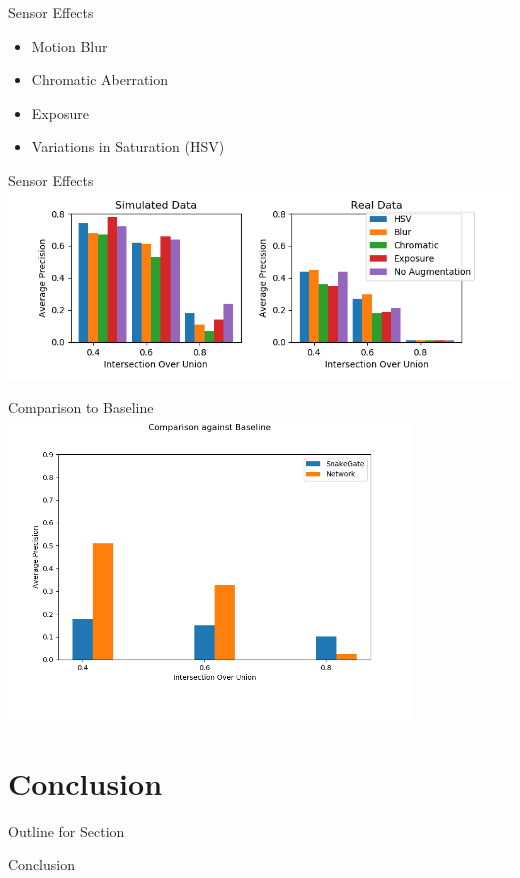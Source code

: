 \documentclass{beamer}
\begin{document}
\begin{darkframes}
    \begin{frame}{Sensor Effects}
\begin{itemize}
	\item Motion Blur 
	\item Chromatic Aberration
	\item Exposure
	\item Variations in Saturation (HSV)
\end{itemize}
\end{frame}
    \begin{frame}{Sensor Effects}
    \includegraphics[width=\textwidth]{../../thesis/fig/pp_bar}
	\end{frame}


      \begin{frame}{Comparison to Baseline}
      \centering
    \includegraphics[width=0.8\textwidth]{../../thesis/fig/comp_baseline}
	\end{frame}

    
    \section{Conclusion}
            \begin{frame}{Outline for Section \thesection}
    \tableofcontents[currentsection]
\end{frame}
    \begin{frame}{Conclusion}


\end{frame}
\end{darkframes}
\end{document}
